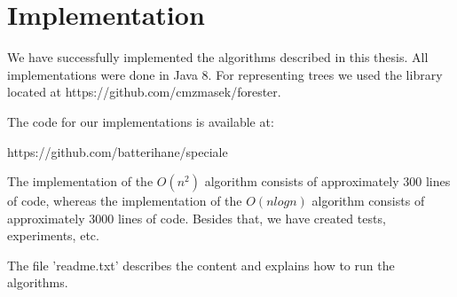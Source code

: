 \chapter{Implementation}
We have successfully implemented the algorithms described in this thesis. All implementations were done in Java 8. For representing trees we used the library located at https://github.com/cmzmasek/forester.

The code for our implementations is available at:

https://github.com/batterihane/speciale

The implementation of the $O(n^2)$ algorithm consists of approximately 300 lines of code, whereas the implementation of the $O(nlogn)$ algorithm consists of approximately 3000 lines of code. Besides that, we have created tests, experiments, etc.

The file 'readme.txt' describes the content and explains how to run the algorithms.

